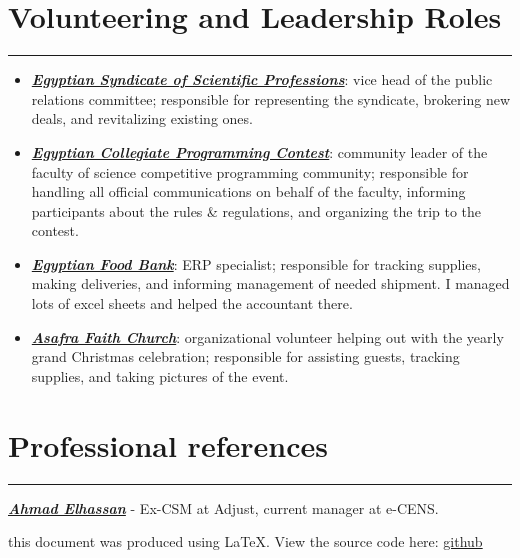 \documentclass[10pt]{article}
\newcommand{\fancy}[1]{\Large\textbf{\textit{#1}}}
\begin{document}
\section*{Volunteering and Leadership Roles}
\hrule
\vspace{1em}
\begin{itemize}
	\item \fancy{\href{https://www.linkedin.com/company/syndicate-of-scientific-professions-alexandria-نقابة-المهن-العلمية-الإسكندرية/}{Egyptian Syndicate of Scientific Professions}}: vice head of the public relations committee; responsible for representing the syndicate, brokering new deals, and revitalizing existing ones.
	\item \fancy{\href{https://www.linkedin.com/showcase/ecpc-egyptian-collegiate-programming-contest1/}{Egyptian Collegiate Programming Contest}}: community leader of the faculty of science competitive programming community; responsible for handling all official communications on behalf of the faculty, informing participants about the rules \& regulations, and organizing the trip to the contest.
	\item \fancy{\href{https://www.linkedin.com/company/egyptian-food-bank/}{Egyptian Food Bank}}: ERP specialist; responsible for tracking supplies, making deliveries, and informing management of needed shipment. I managed lots of excel sheets and helped the accountant there.
	\item \fancy{\href{https://www.linkedin.com/company/asafra-faith-church/}{Asafra Faith Church}}: organizational volunteer helping out with the yearly grand Christmas celebration; responsible for assisting guests, tracking supplies, and taking pictures of the event.
\end{itemize}

\section*{Professional references}
\hrule
\vspace{1em}
\fancy{\href{https://www.linkedin.com/in/ahmad-el-hassan-05557013b/}{Ahmad Elhassan}} - Ex-CSM at Adjust, current manager at e-CENS.


\begin{center}
	{\tiny this document was produced using \LaTeX. View the source code here: \href{https://github.com/aaamw2000/myLaTeX/tree/main/pii/adjustCV}{github}}
\end{center}
\end{document}
